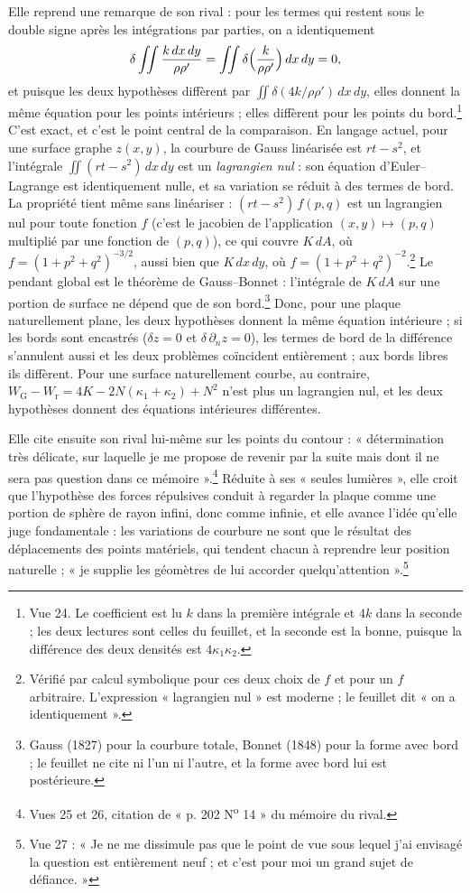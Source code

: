 \documentclass[11pt,a4paper]{article}
\begin{document}
Elle reprend une remarque de son rival : pour les termes qui restent sous le
double signe après les intégrations par parties, on a identiquement
\[
\delta\iint \frac{k\,dx\,dy}{\rho\rho'} = \iint \delta\Bigl(\frac{k}{\rho\rho'}
\Bigr)\,dx\,dy = 0 ,
\]
et puisque les deux hypothèses diffèrent par $\iint \delta(4k/\rho\rho')\,dx\,dy$,
elles donnent la même équation pour les points intérieurs ; elles diffèrent
pour les points du bord.\footnote{Vue 24. Le coefficient est lu $k$ dans la
première intégrale et $4k$ dans la seconde ; les deux lectures sont celles du
feuillet, et la seconde est la bonne, puisque la différence des deux densités
est $4\kappa_1\kappa_2$.} C'est exact, et c'est le point central de la comparaison. En
langage actuel, pour une surface graphe $z(x,y)$, la courbure de Gauss
linéarisée est $rt - s^2$, et l'intégrale $\iint (rt - s^2)\,dx\,dy$ est un
\emph{lagrangien nul} : son équation d'Euler--Lagrange est identiquement
nulle, et sa variation se réduit à des termes de bord. La propriété tient même
sans linéariser : $(rt - s^2)\,f(p,q)$ est un lagrangien nul pour toute
fonction $f$ (c'est le jacobien de l'application $(x,y) \mapsto (p,q)$ multiplié
par une fonction de $(p,q)$), ce qui couvre $K\,dA$, où $f = (1+p^2+q^2)^{-3/2}$,
aussi bien que $K\,dx\,dy$, où $f = (1+p^2+q^2)^{-2}$.\footnote{Vérifié par
calcul symbolique pour ces deux choix de $f$ et pour un $f$ arbitraire.
L'expression « lagrangien nul » est moderne ; le feuillet dit « on a
identiquement ».} Le pendant global est le théorème de Gauss--Bonnet : l'intégrale
de $K\,dA$ sur une portion de surface ne dépend que de son bord.\footnote{Gauss
(1827) pour la courbure totale, Bonnet (1848) pour la forme avec bord ; le
feuillet ne cite ni l'un ni l'autre, et la forme avec bord lui est
postérieure.} Donc, pour une plaque naturellement plane, les deux hypothèses
donnent la même équation intérieure ; si les bords sont encastrés
($\delta z = 0$ et $\delta\,\partial_n z = 0$), les termes de bord de la
différence s'annulent aussi et les deux problèmes coïncident entièrement ; aux
bords libres ils diffèrent. Pour une surface naturellement courbe, au
contraire, $W_{\mathrm{G}} - W_{\mathrm{r}} = 4K - 2N(\kappa_1+\kappa_2) + N^2$
n'est plus un lagrangien nul, et les deux hypothèses donnent des équations
intérieures différentes.

Elle cite ensuite son rival lui-même sur les points du contour : « détermination
très délicate, sur laquelle je me propose de revenir par la suite mais dont il
ne sera pas question dans ce mémoire ».\footnote{Vues 25 et 26, citation de
« p. 202 N\textsuperscript{o} 14 » du mémoire du rival.} Réduite à ses « seules lumières », elle
croit que l'hypothèse des forces répulsives conduit à regarder la plaque comme
une portion de sphère de rayon infini, donc comme infinie, et elle avance
l'idée qu'elle juge fondamentale : les variations de courbure ne sont que le
résultat des déplacements des points matériels, qui tendent chacun à reprendre
leur position naturelle ; « je supplie les géomètres de lui accorder
quelqu'attention ».\footnote{Vue 27 : « Je ne me dissimule pas que le point de
vue sous lequel j'ai envisagé la question est entièrement neuf ; et c'est pour
moi un grand sujet de défiance. »}
\end{document}
